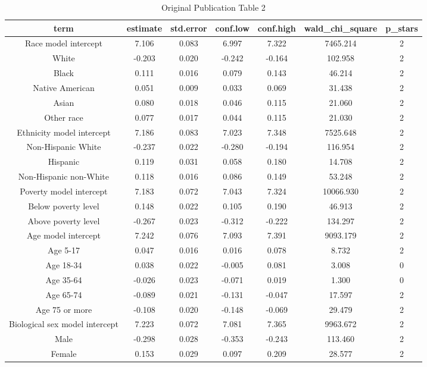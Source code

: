 \documentclass[
]{article}
\begin{document}
\begin{table}

\caption{\label{tab:load-table2}Original Publication Table 2}
\centering
\begin{tabular}[t]{c|c|c|c|c|c|c}
\hline
term & estimate & std.error & conf.low & conf.high & wald\_chi\_square & p\_stars\\
\hline
Race model intercept & 7.106 & 0.083 & 6.997 & 7.322 & 7465.214 & 2\\
\hline
White & -0.203 & 0.020 & -0.242 & -0.164 & 102.958 & 2\\
\hline
Black & 0.111 & 0.016 & 0.079 & 0.143 & 46.214 & 2\\
\hline
Native American & 0.051 & 0.009 & 0.033 & 0.069 & 31.438 & 2\\
\hline
Asian & 0.080 & 0.018 & 0.046 & 0.115 & 21.060 & 2\\
\hline
Other race & 0.077 & 0.017 & 0.044 & 0.115 & 21.030 & 2\\
\hline
Ethnicity model intercept & 7.186 & 0.083 & 7.023 & 7.348 & 7525.648 & 2\\
\hline
Non-Hispanic White & -0.237 & 0.022 & -0.280 & -0.194 & 116.954 & 2\\
\hline
Hispanic & 0.119 & 0.031 & 0.058 & 0.180 & 14.708 & 2\\
\hline
Non-Hispanic non-White & 0.118 & 0.016 & 0.086 & 0.149 & 53.248 & 2\\
\hline
Poverty model intercept & 7.183 & 0.072 & 7.043 & 7.324 & 10066.930 & 2\\
\hline
Below poverty level & 0.148 & 0.022 & 0.105 & 0.190 & 46.913 & 2\\
\hline
Above poverty level & -0.267 & 0.023 & -0.312 & -0.222 & 134.297 & 2\\
\hline
Age model intercept & 7.242 & 0.076 & 7.093 & 7.391 & 9093.179 & 2\\
\hline
Age 5-17 & 0.047 & 0.016 & 0.016 & 0.078 & 8.732 & 2\\
\hline
Age 18-34 & 0.038 & 0.022 & -0.005 & 0.081 & 3.008 & 0\\
\hline
Age 35-64 & -0.026 & 0.023 & -0.071 & 0.019 & 1.300 & 0\\
\hline
Age 65-74 & -0.089 & 0.021 & -0.131 & -0.047 & 17.597 & 2\\
\hline
Age 75 or more & -0.108 & 0.020 & -0.148 & -0.069 & 29.479 & 2\\
\hline
Biological sex model intercept & 7.223 & 0.072 & 7.081 & 7.365 & 9963.672 & 2\\
\hline
Male & -0.298 & 0.028 & -0.353 & -0.243 & 113.460 & 2\\
\hline
Female & 0.153 & 0.029 & 0.097 & 0.209 & 28.577 & 2\\
\hline
\end{tabular}
\end{table}
\end{document}
